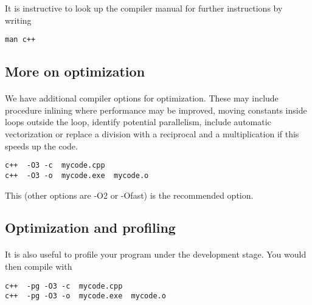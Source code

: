 \documentclass[%
oneside,                 %
final,                   %
10pt]{article}
\begin{document}
It is instructive to look up the compiler manual for further instructions by writing


\begin{verbatim}
man c++

\end{verbatim}


\subsection*{More on optimization}

\paragraph{}
We have additional compiler options for optimization. These may include procedure inlining where 
performance may be improved, moving constants inside loops outside the loop, 
identify potential parallelism, include automatic vectorization or replace a division with a reciprocal
and a multiplication if this speeds up the code.



\begin{verbatim}
c++  -O3 -c  mycode.cpp
c++  -O3 -o  mycode.exe  mycode.o

\end{verbatim}

This (other options are -O2 or -Ofast) is the recommended option.


\subsection*{Optimization and profiling}

\paragraph{}
It is also useful to profile your program under the development stage.
You would then compile with 



\begin{verbatim}
c++  -pg -O3 -c  mycode.cpp
c++  -pg -O3 -o  mycode.exe  mycode.o

\end{verbatim}
\end{document}
